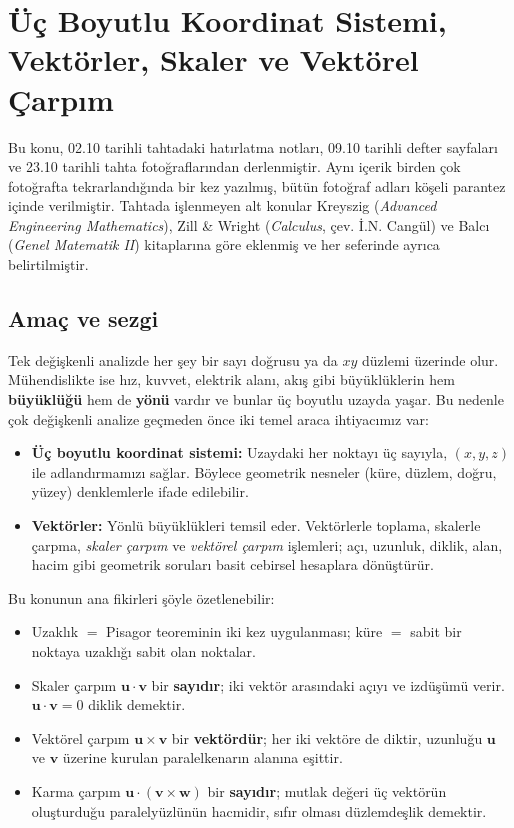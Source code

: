 \section{Üç Boyutlu Koordinat Sistemi, Vektörler, Skaler ve Vektörel Çarpım}

\begin{bilgi}
Bu konu, 02.10 tarihli tahtadaki hatırlatma notları, 09.10 tarihli defter sayfaları ve 23.10 tarihli tahta fotoğraflarından derlenmiştir. Aynı içerik birden çok fotoğrafta tekrarlandığında bir kez yazılmış, bütün fotoğraf adları köşeli parantez içinde verilmiştir. Tahtada işlenmeyen alt konular Kreyszig (\emph{Advanced Engineering Mathematics}), Zill \& Wright (\emph{Calculus}, çev. İ.N. Cangül) ve Balcı (\emph{Genel Matematik II}) kitaplarına göre eklenmiş ve her seferinde ayrıca belirtilmiştir.
\end{bilgi}

\subsection{Amaç ve sezgi}

Tek değişkenli analizde her şey bir sayı doğrusu ya da $xy$ düzlemi üzerinde olur. Mühendislikte ise hız, kuvvet, elektrik alanı, akış gibi büyüklüklerin hem \textbf{büyüklüğü} hem de \textbf{yönü} vardır ve bunlar üç boyutlu uzayda yaşar. Bu nedenle çok değişkenli analize geçmeden önce iki temel araca ihtiyacımız var:

\begin{itemize}
\item \textbf{Üç boyutlu koordinat sistemi:} Uzaydaki her noktayı üç sayıyla, $(x,y,z)$ ile adlandırmamızı sağlar. Böylece geometrik nesneler (küre, düzlem, doğru, yüzey) denklemlerle ifade edilebilir.
\item \textbf{Vektörler:} Yönlü büyüklükleri temsil eder. Vektörlerle toplama, skalerle çarpma, \emph{skaler çarpım} ve \emph{vektörel çarpım} işlemleri; açı, uzunluk, diklik, alan, hacim gibi geometrik soruları basit cebirsel hesaplara dönüştürür.
\end{itemize}

Bu konunun ana fikirleri şöyle özetlenebilir:
\begin{itemize}
\item Uzaklık $=$ Pisagor teoreminin iki kez uygulanması; küre $=$ sabit bir noktaya uzaklığı sabit olan noktalar.
\item Skaler çarpım $\mathbf u\cdot\mathbf v$ bir \textbf{sayıdır}; iki vektör arasındaki açıyı ve izdüşümü verir. $\mathbf u\cdot\mathbf v=0$ diklik demektir.
\item Vektörel çarpım $\mathbf u\times\mathbf v$ bir \textbf{vektördür}; her iki vektöre de diktir, uzunluğu $\mathbf u$ ve $\mathbf v$ üzerine kurulan paralelkenarın alanına eşittir.
\item Karma çarpım $\mathbf u\cdot(\mathbf v\times\mathbf w)$ bir \textbf{sayıdır}; mutlak değeri üç vektörün oluşturduğu paralelyüzlünün hacmidir, sıfır olması düzlemdeşlik demektir.
\end{itemize}

